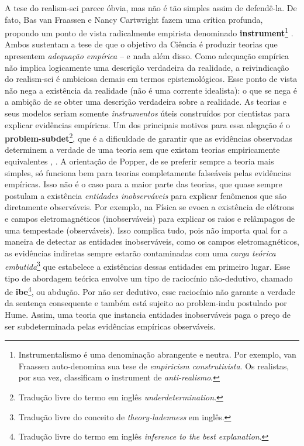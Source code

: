 \documentclass[./main.tex]{subfiles}
\begin{document}
\par A tese do \gls{realism-sci} parece óbvia, mas não é tão simples assim de defendê-la. De fato, Bas van Fraassen \cite{bas1980} e Nancy Cartwright \cite{nancy1983} fazem uma crítica profunda, propondo um ponto de vista radicalmente empirista denominado \textbf{\gls{instrument}}\footnote{Instrumentalismo é uma denominação  abrangente e neutra. Por exemplo, van Fraassen auto-denomina sua tese de \textit{\gls{empiricism} construtivista}. Os realistas, por sua vez, classificam o \gls{instrument} de \textit{anti-realismo}.} \cite{sep-constructive-empiricism}. Ambos sustentam a tese de que o objetivo da Ciência é produzir teorias que apresentem \textit{adequação empírica} -- e nada além disso. Como adequação empírica não implica logicamente uma descrição verdadeira da realidade, a reivindicação do \gls{realism-sci} é ambiciosa demais em termos epistemológicos. Esse ponto de vista não nega a existência da realidade (não é uma corrente idealista): o que se nega é a ambição de se obter uma descrição verdadeira sobre a realidade. As teorias e seus modelos seriam somente \textit{instrumentos} úteis construídos por cientistas para explicar evidências empíricas. Um dos principais motivos para essa alegação é o \textbf{\gls{problem-subdet}}\footnote{Tradução livre do termo em inglês \textit{underdetermination}.}, que é a dificuldade de garantir que as evidências observadas determinem a verdade de uma \gls{teoria} sem que existam teorias empiricamente equivalentes \cite{sep-scientific-underdet}, \cite{Tulodziecki2017}. A orientação de Popper, de se preferir sempre a \gls{teoria} mais simples, só funciona bem para teorias completamente falseáveis pelas evidências empíricas. Isso não é o caso para a maior parte das teorias, que quase sempre postulam a existência \textit{entidades inobserváveis} para explicar fenômenos que são diretamente observáveis. Por exemplo, na Física se evoca a existência de elétrons e campos eletromagnéticos (inobserváveis) para explicar os raios e relâmpagos de uma tempestade (observáveis). Isso complica tudo, pois não importa qual for a maneira de detectar as entidades inobserváveis, como os campos eletromagnéticos, as evidências indiretas sempre estarão contaminadas com uma \textit{carga teórica embutida}\footnote{Tradução livre do conceito de \textit{theory-ladenness} em inglês.} que estabelece a existências dessas entidades em primeiro lugar. Esse tipo de abordagem teórica envolve um tipo de raciocínio não-dedutivo, chamado de \textbf{\gls{ibe}}\footnote{Tradução livre do termo em inglês \textit{inference to the best explanation}.}, ou abdução. Por não ser dedutivo, esse raciocínio não garante a verdade da sentença consequente e também está sujeito ao \gls{problem-indu} postulado por Hume. Assim, uma \gls{teoria} que instancia entidades inobserváveis paga o preço de ser subdeterminada pelas evidências empíricas observáveis.
\end{document}

